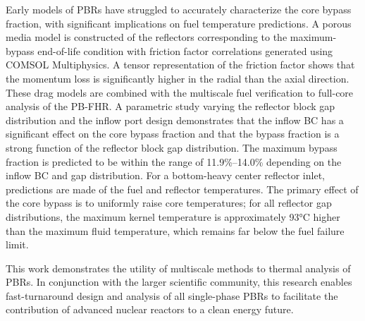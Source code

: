 \documentclass{ucbthesis}
\begin{document}
Early models of PBRs have struggled to accurately characterize the core bypass fraction, with significant implications on fuel temperature predictions. A porous media model is constructed of the reflectors corresponding to the maximum-bypass end-of-life condition with friction factor correlations generated using COMSOL Multiphysics. A tensor representation of the friction factor shows that the momentum loss is significantly higher in the radial than the axial direction. These drag models are combined with the multiscale fuel verification to full-core analysis of the PB-FHR. A parametric study varying the reflector block gap distribution and the inflow port design demonstrates that the inflow BC has a significant effect on the core bypass fraction and that the bypass fraction is a strong function of the reflector block gap distribution. The maximum bypass fraction is predicted to be within the range of 11.9\%--14.0\% depending on the inflow BC and gap distribution. For a bottom-heavy center reflector inlet, predictions are made of the fuel and reflector temperatures. The primary effect of the core bypass is to uniformly raise core temperatures; for all reflector gap distributions, the maximum kernel temperature is approximately 93\si{\celsius} higher than the maximum fluid temperature, which remains far below the fuel failure limit.

This work demonstrates the utility of multiscale methods to thermal analysis of PBRs. In conjunction with the larger scientific community, this research enables fast-turnaround design and analysis of all single-phase PBRs to facilitate the contribution of advanced nuclear reactors to a clean energy future. 
\end{document}
